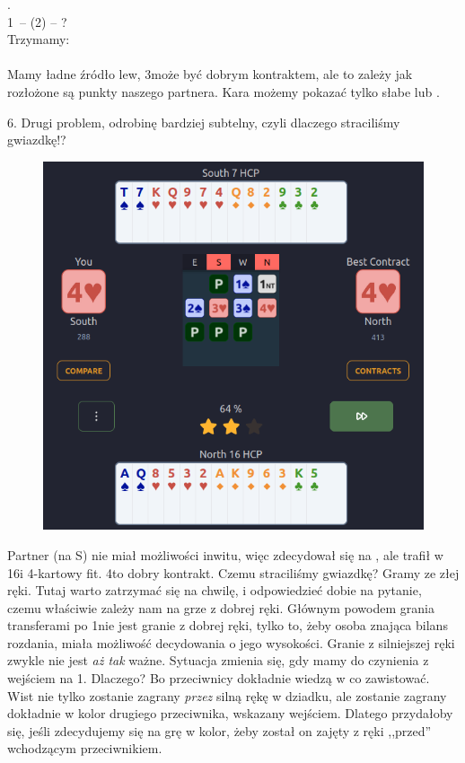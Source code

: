 \documentclass[12pt, a4paper]{article}
\begin{document}
\vspace{0.3cm}
.\\
1\nt\ -- (2\hearts) -- ?\\
Trzymamy:\\
\\
Mamy ładne źródło lew, 3\nt może być dobrym kontraktem, ale to zależy jak rozłożone
są punkty naszego partnera. Kara możemy pokazać tylko słabe lub \gf.

6. Drugi problem, odrobinę bardziej subtelny, czyli dlaczego straciliśmy gwiazdkę!?

\begin{figure}[H]
    \centering
    \includegraphics[width=0.7\linewidth]{cuebids.png}
\end{figure}

Partner (na S) nie miał możliwości inwitu, więc zdecydował się na \gf, ale trafił w
16\hcp i 4-kartowy fit. 4\hearts to dobry kontrakt. Czemu straciliśmy gwiazdkę? Gramy ze złej ręki.
Tutaj warto zatrzymać się na chwilę, i odpowiedzieć dobie na pytanie, czemu właściwie
zależy nam na grze z dobrej ręki. Głównym powodem grania transferami po 1\nt nie jest granie z dobrej ręki,
tylko to, żeby osoba znająca bilans rozdania, miała możliwość decydowania o jego wysokości.
Granie z silniejszej ręki zwykle nie jest \textit{aż tak} ważne. Sytuacja zmienia się, gdy mamy do czynienia
z wejściem na 1\nt. Dlaczego? Bo przeciwnicy dokładnie wiedzą w co zawistować. Wist nie tylko
zostanie zagrany \textit{przez} silną rękę w dziadku, ale zostanie zagrany dokładnie w kolor drugiego
przeciwnika, wskazany wejściem. Dlatego przydałoby się, jeśli zdecydujemy się na grę w kolor, 
żeby został on zajęty z ręki ,,przed'' wchodzącym przeciwnikiem.
\end{document}

